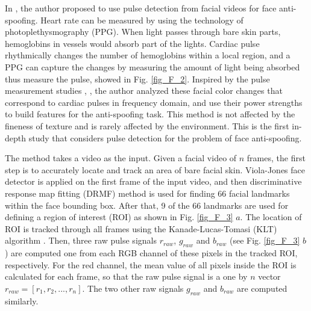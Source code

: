 \documentclass[journal]{IEEEtran}
\begin{document}
In \cite{li2016generalized}, the author proposed to use pulse detection from facial videos for face anti-spoofing. Heart rate can be measured by using the technology of photoplethysmography (PPG).  When light passes through bare skin parts, hemoglobins in vessels would absorb part of the lights. Cardiac pulse rhythmically changes the number of hemoglobins within a local region, and a PPG can capture the changes by measuring the amount of light being absorbed thus measure the pulse,  showed in Fig. \ref{fig_F_2}. Inspired by the pulse measurement studies \cite{li2014remote}, \cite{poh2011advancements}, the author analyzed these facial color changes that correspond to cardiac pulses in frequency domain, and use their power strengths to build features for the anti-spoofing task. This method is not affected by the fineness of texture and is rarely affected by the environment.  This is the first in-depth study that considers pulse detection for the problem of face anti-spoofing.


The method takes a video as the input. Given a facial video of $n$ frames, the first step is to accurately locate and track an area of bare facial skin.  Viola-Jones face detector \cite{viola2001rapid} is applied on the first frame of the input video, and then discriminative response map fitting (DRMF) method \cite{asthana2013robust} is used for finding 66 facial landmarks within the face bounding box. After that,  9 of the 66 landmarks are used for defining a region of interest (ROI) as shown in Fig. \ref{fig_F_3} $a$. The location of ROI is tracked through all frames using the Kanade-Lucas-Tomasi (KLT) algorithm \cite{tomasi1991detection}. Then, three raw pulse signals $r_{raw}$, $g_{raw}$ and $b_{raw}$ (see Fig. \ref{fig_F_3} $b$) are computed one from each RGB channel of these pixels in the tracked ROI, respectively.  For the red channel, the mean value of all pixels inside the ROI is calculated for each frame, so that the raw pulse signal is a one by $n$ vector $r_{raw} = [r_1 , r_2 , . . . , r_n]$. The two other raw signals $g_{raw}$ and $b_{raw}$ are computed similarly.
\end{document}
